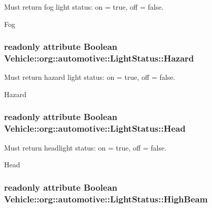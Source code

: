 Must return fog light status\-: on = true, off = false. 

Fog \hypertarget{interfaceVehicle_1_1org_1_1automotive_1_1LightStatus_a5db8686f55c3a28a4b5bd2ffe0f083ad}{
\subsubsection[{Hazard}]{\setlength{\rightskip}{0pt plus 5cm}readonly attribute Boolean Vehicle\-::org\-::automotive\-::\-Light\-Status\-::\-Hazard}}\label{interfaceVehicle_1_1org_1_1automotive_1_1LightStatus_a5db8686f55c3a28a4b5bd2ffe0f083ad}


Must return hazard light status\-: on = true, off = false. 

Hazard \hypertarget{interfaceVehicle_1_1org_1_1automotive_1_1LightStatus_a6002dfa8db628803dcc7fd05d31e4ba3}{
\subsubsection[{Head}]{\setlength{\rightskip}{0pt plus 5cm}readonly attribute Boolean Vehicle\-::org\-::automotive\-::\-Light\-Status\-::\-Head}}\label{interfaceVehicle_1_1org_1_1automotive_1_1LightStatus_a6002dfa8db628803dcc7fd05d31e4ba3}


Must return headlight status\-: on = true, off = false. 

Head \hypertarget{interfaceVehicle_1_1org_1_1automotive_1_1LightStatus_a82173fb527011454e187e0aded475b20}{
\subsubsection[{High\-Beam}]{\setlength{\rightskip}{0pt plus 5cm}readonly attribute Boolean Vehicle\-::org\-::automotive\-::\-Light\-Status\-::\-High\-Beam}}\label{interfaceVehicle_1_1org_1_1automotive_1_1LightStatus_a82173fb527011454e187e0aded475b20}


